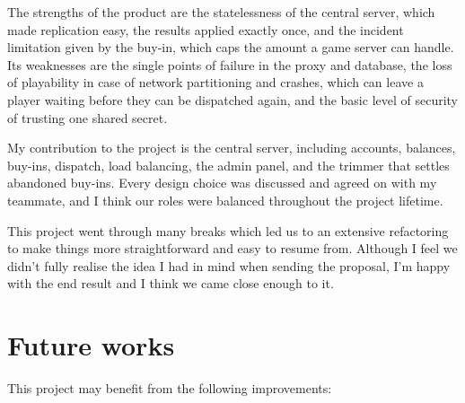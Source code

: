\documentclass{scrartcl}
\begin{document}
The strengths of the product are the statelessness of the central server, which made replication easy, the results applied exactly once, and the incident limitation given by the buy-in, which caps the amount a game server can handle.
Its weaknesses are the single points of failure in the proxy and database, the loss of playability in case of network partitioning and crashes, which can leave a player waiting before they can be dispatched again, and the basic level of security of trusting one shared secret.

My contribution to the project is the central server, including accounts, balances, buy-ins, dispatch, load balancing, the admin panel, and the trimmer that settles abandoned buy-ins.
Every design choice was discussed and agreed on with my teammate, and I think our roles were balanced throughout the project lifetime.

This project went through many breaks which led us to an extensive refactoring to make things more straightforward and easy to resume from. Although I feel we didn't fully realise the idea I had in mind when sending the proposal, I'm happy with the end result and I think we came close enough to it.




\section{Future works}\label{future-works}

This project may benefit from the following improvements:
\end{document}
